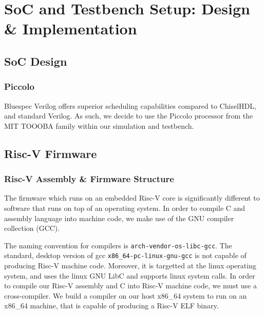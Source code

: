 \documentclass[a4paper,8pt]{report}
\begin{document}




\chapter{SoC and Testbench Setup: Design \& Implementation}
\section{SoC Design}
\subsection{Piccolo}
Bluespec Verilog offers superior scheduling capabilities compared to ChiselHDL,
and standard Verilog. As such, we decide to use the Piccolo processor from the
MIT TOOOBA family within our simulation and testbench. 


\section{Risc-V Firmware}
\subsection{Risc-V Assembly \& Firmware Structure}
The firmware which runs on an embedded Risc-V core is significantly different to
software that runs on top of an operating system. In order to compile C and
assembly language into machine code, we make use of the GNU compiler collection
(GCC).

The naming convention for compilers is \texttt{arch-vendor-os-libc-gcc}. The
standard, desktop version of gcc \texttt{x86\_64-pc-linux-gnu-gcc} is not
capable of producing Risc-V machine code. Moreover, it is targetted at the linux
operating system, and uses the linux GNU LibC and supports linux system calls.
In order to compile our Risc-V assembly and C into Risc-V machine code, we must
use a cross-compiler. We build a compiler on our host x86\_64 system to run on
an x86\_64 machine, that is capable of producing a Risc-V ELF binary.
\end{document}
